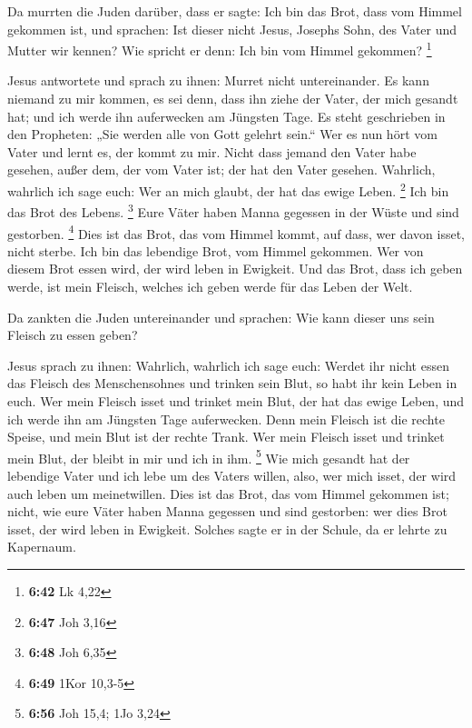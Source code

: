  Da murrten die Juden darüber, dass er sagte: Ich bin das
Brot, dass vom Himmel gekommen ist,  und sprachen: Ist
dieser nicht Jesus, Josephs Sohn, des Vater und Mutter wir kennen? Wie
spricht er denn: Ich bin vom Himmel gekommen? \footnote{\textbf{6:42} Lk
  4,22}

 Jesus antwortete und sprach zu ihnen: Murret nicht
untereinander.  Es kann niemand zu mir kommen, es sei
denn, dass ihn ziehe der Vater, der mich gesandt hat; und ich werde ihn
auferwecken am Jüngsten Tage.  Es steht geschrieben in
den Propheten: „Sie werden alle von Gott gelehrt sein.`` Wer es nun hört
vom Vater und lernt es, der kommt zu mir.  Nicht dass
jemand den Vater habe gesehen, außer dem, der vom Vater ist; der hat den
Vater gesehen.  Wahrlich, wahrlich ich sage euch: Wer an
mich glaubt, der hat das ewige Leben. \footnote{\textbf{6:47} Joh 3,16}
 Ich bin das Brot des Lebens. \footnote{\textbf{6:48} Joh
  6,35}  Eure Väter haben Manna gegessen in der Wüste und
sind gestorben. \footnote{\textbf{6:49} 1Kor 10,3-5} 
Dies ist das Brot, das vom Himmel kommt, auf dass, wer davon isset,
nicht sterbe.  Ich bin das lebendige Brot, vom Himmel
gekommen. Wer von diesem Brot essen wird, der wird leben in Ewigkeit.
Und das Brot, dass ich geben werde, ist mein Fleisch, welches ich geben
werde für das Leben der Welt.

 Da zankten die Juden untereinander und sprachen: Wie
kann dieser uns sein Fleisch zu essen geben?

 Jesus sprach zu ihnen: Wahrlich, wahrlich ich sage euch:
Werdet ihr nicht essen das Fleisch des Menschensohnes und trinken sein
Blut, so habt ihr kein Leben in euch.  Wer mein Fleisch
isset und trinket mein Blut, der hat das ewige Leben, und ich werde ihn
am Jüngsten Tage auferwecken.  Denn mein Fleisch ist die
rechte Speise, und mein Blut ist der rechte Trank.  Wer
mein Fleisch isset und trinket mein Blut, der bleibt in mir und ich in
ihm. \footnote{\textbf{6:56} Joh 15,4; 1Jo 3,24}  Wie
mich gesandt hat der lebendige Vater und ich lebe um des Vaters willen,
also, wer mich isset, der wird auch leben um meinetwillen.
 Dies ist das Brot, das vom Himmel gekommen ist; nicht,
wie eure Väter haben Manna gegessen und sind gestorben: wer dies Brot
isset, der wird leben in Ewigkeit.  Solches sagte er in
der Schule, da er lehrte zu Kapernaum.

